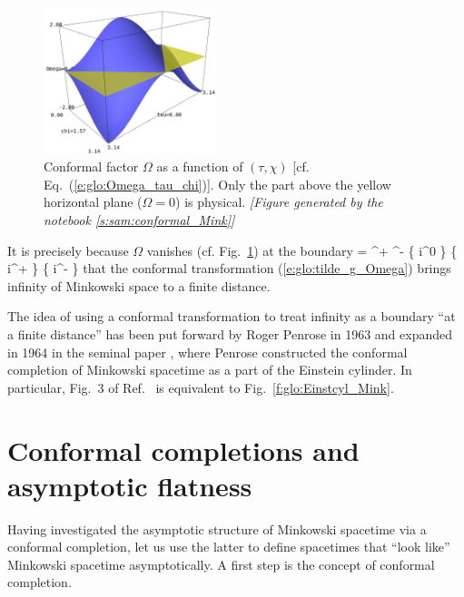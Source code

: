 \begin{figure}
\centerline{\includegraphics[width=0.45\textwidth]{glo_Omega_Mink.jpg}}
\caption[]{\label{f:glo:Omega_Mink}\footnotesize
Conformal factor $\Omega$ as a function of $(\tau,\chi)$ [cf. Eq.~(\ref{e:glo:Omega_tau_chi})].
Only the part above the yellow horizontal plane ($\Omega=0$) is physical.
\textsl{[Figure generated by the notebook \ref{s:sam:conformal_Mink}]}
}
\end{figure}


It is precisely because $\Omega$ vanishes (cf. Fig.~\ref{f:glo:Omega_Mink}) at the boundary
\be
    \overline{\M} \setminus \M = \scri^+ \cup \scri^- \cup \left\{ i^0 \right\} \cup
            \left\{ i^+ \right\} \cup \left\{ i^- \right\}
\ee
that the conformal transformation (\ref{e:glo:tilde_g_Omega}) brings infinity
of Minkowski space to a finite distance.

\begin{hist}
The idea of using a conformal transformation to treat infinity as a boundary
``at a finite distance'' has been put forward by Roger Penrose
in 1963 \cite{Penro63} and expanded in 1964 in the seminal paper \cite{Penro64},
where Penrose constructed the
conformal completion of Minkowski spacetime as a part of the Einstein cylinder.
In particular, Fig.~3 of Ref.~\cite{Penro64} is equivalent to Fig.~\ref{f:glo:Einstcyl_Mink}.
\end{hist}



\section{Conformal completions and asymptotic flatness} \label{s:glo:conf_compl}

Having investigated the asymptotic structure of Minkowski spacetime
via a conformal completion, let us use the latter to define spacetimes
that ``look like'' Minkowski spacetime asymptotically.
A first step is the concept of conformal completion.

